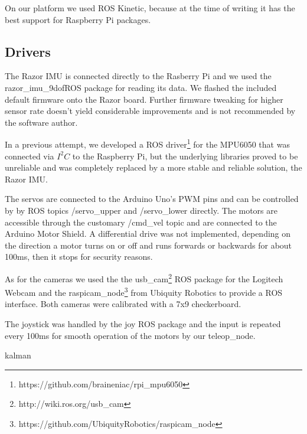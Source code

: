 \documentclass[class=report, crop=false]{standalone}
\begin{document}
On our platform we used ROS Kinetic, because at the time of writing it has the best support for Raspberry Pi packages.

\subsection{Drivers}\label{subsec:drivers}
The Razor IMU is connected directly to the Rasberry Pi and we used the razor\_imu\_9dof\footnotemark ROS package for reading its data. We flashed the included default firmware onto the Razor board. Further firmware tweaking for higher sensor rate doesn't yield considerable improvements and is not recommended by the software author.


In a previous attempt, we developed a ROS driver\footnote{https://github.com/braineniac/rpi\_mpu6050} for the MPU6050 that was connected via $ I^2C $ to the Raspberry Pi, but the underlying libraries proved to be unreliable and was completely replaced by a more stable and reliable solution, the Razor IMU.

The servos are connected to the Arduino Uno's PWM pins and can be controlled by by ROS topics /servo\_upper and /servo\_lower directly. The motors are accessible through the customary /cmd\_vel topic and are connected to the Arduino Motor Shield. A differential drive was not implemented, depending on the direction a motor turns on or off and runs forwards or backwards for about 100ms, then it stops for security reasons.

As for the cameras we used the the usb\_cam\footnote{http://wiki.ros.org/usb\_cam} ROS package for the Logitech Webcam and the raspicam\_node\footnote{https://github.com/UbiquityRobotics/raspicam\_node} from Ubiquity Robotics to provide a ROS interface. Both cameras were calibrated with a 7x9 checkerboard.

The joystick was handled by the joy ROS package and the input is repeated every 100ms for smooth operation of the motors by our teleop\_node.


{kalman}

\end{document}
